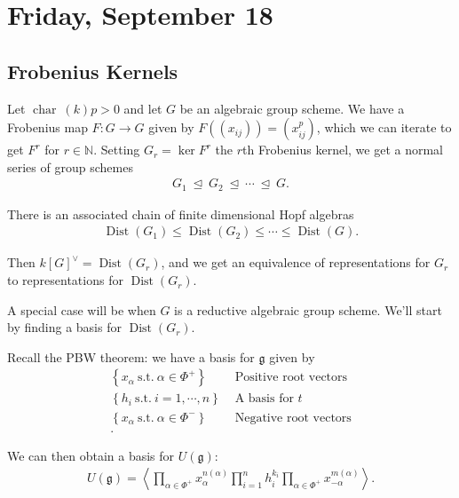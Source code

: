 \hypertarget{friday-september-18}{%
\section{Friday, September 18}\label{friday-september-18}}

\hypertarget{frobenius-kernels-1}{%
\subsection{Frobenius Kernels}\label{frobenius-kernels-1}}

Let \(\operatorname{char}~(k) p > 0\) and let \(G\) be an algebraic
group scheme. We have a Frobenius map \(F:G\to G\) given by
\(F((x_{ij})) = (x_{ij}^p)\), which we can iterate to get \(F^r\) for
\(r\in {\mathbb{N}}\). Setting \(G_r = \ker F^r\) the \(r\)th Frobenius
kernel, we get a normal series of group schemes
\begin{align*}   G_1 {~\trianglelefteq~}G_2 {~\trianglelefteq~}\cdots {~\trianglelefteq~}G .\end{align*}

There is an associated chain of finite dimensional Hopf algebras
\begin{align*}   \operatorname{Dist}(G_1) \leq \operatorname{Dist}(G_2) \leq \cdots \leq \operatorname{Dist}(G) .\end{align*}

Then \(k[G]^\vee= \operatorname{Dist}(G_r)\), and we get an equivalence
of representations for \(G_r\) to representations for
\(\operatorname{Dist}(G_r)\).

A special case will be when \(G\) is a reductive algebraic group scheme.
We'll start by finding a basis for \(\operatorname{Dist}(G_r)\).

Recall the PBW theorem: we have a basis for \({\mathfrak{g}}\) given by
\begin{align*}   \left\{{x_\alpha ~{\text{s.t.}}~\alpha\in \Phi^+ }\right\} &\text{ Positive root vectors} \\ \left\{{h_i ~{\text{s.t.}}~i=1,\cdots, n}\right\} &\text{ A basis for } t \\ \left\{{x_\alpha ~{\text{s.t.}}~\alpha\in \Phi^- }\right\} &\text{ Negative root vectors} \\ .\end{align*}

We can then obtain a basis for \(U({\mathfrak{g}})\):
\begin{align*}   U({\mathfrak{g}}) = \left\langle{ \prod_{\alpha\in\Phi^+} x_\alpha^{n(\alpha)} \prod_{i=1}^n h_i^{k_i} \prod_{\alpha\in\Phi^+} x_{-\alpha}^{m(\alpha)}  }\right\rangle .\end{align*}

